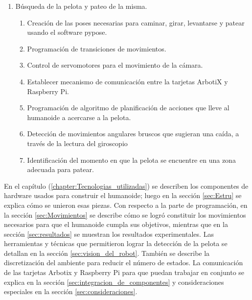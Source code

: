 \begin{enumerate}
\item Búsqueda de la pelota y pateo de la misma. 
\begin{enumerate}
\item Creación de las poses necesarias para caminar, girar, levantarse y patear usando el software pypose.
\item Programación de transiciones de movimientos.
\item Control de servomotores para el movimiento de la cámara.
\item Establecer mecanismo de comunicación entre la tarjetas ArbotiX y Raspberry Pi.  
\item Programación de algoritmo de planificación de acciones que lleve al humanoide a acercarse a la pelota.
\item Detección de movimientos angulares bruscos que sugieran una caída, a través de la lectura del giroscopio
\item Identificación del momento en que la pelota se encuentre en una zona adecuada para patear.
\end{enumerate}
\end{enumerate}

En el capítulo (\ref{chapter:Tecnologias_utilizadas}) se describen los componentes de hardware usados para construir el humanoide; luego en la sección \ref{sec:Estru}
se explica cómo se unieron esas piezas. Con respecto a la parte de programación, en la secci\'on \ref{sec:Movimientos} se describe c\'omo se logró constituir los movimientos necesarios para que el humanoide cumpla sus objetivos, mientras que en la secci\'on \ref{sec:resultados} se muestran los resultados experimentales. Las herramientas y técnicas  que  permitieron lograr  la detección de la pelota se detallan en la secci\'on \ref{sec:vision_del_robot}. También se describe la discretización del ambiente para reducir el n\'umero de estados. La comunicación de las tarjetas Arbotix y Raspberry Pi para que puedan trabajar en conjunto se explica en la secci\'on \ref{sec:integracion_de_componentes}  y consideraciones especiales en la secci\'on \ref{sec:consideraciones}.
